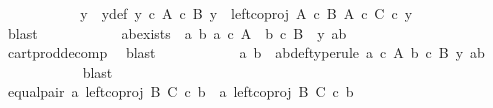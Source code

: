 \begin{isabellebody}
\ \ \ \ \ \ \ \ \isamarkupfalse%
\ \isamarkupfalse%
\ y{\isacharprime}{\kern0pt}\ \ y{\isacharprime}{\kern0pt}{\isacharunderscore}{\kern0pt}def{\isacharcolon}{\kern0pt}\ {\isachardoublequoteopen}y{\isacharprime}{\kern0pt}\ {\isasymin}\isactrlsub c\ A\ {\isasymtimes}\isactrlsub c\ B{\isachardoublequoteclose}\ {\isachardoublequoteopen}y\ {\isacharequal}{\kern0pt}\ left{\isacharunderscore}{\kern0pt}coproj\ {\isacharparenleft}{\kern0pt}A\ {\isasymtimes}\isactrlsub c\ B{\isacharparenright}{\kern0pt}\ {\isacharparenleft}{\kern0pt}A\ {\isasymtimes}\isactrlsub c\ C{\isacharparenright}{\kern0pt}\ {\isasymcirc}\isactrlsub c\ y{\isacharprime}{\kern0pt}{\isachardoublequoteclose}\isanewline
\ \ \ \ \ \ \ \ \ \ \isamarkupfalse%
\ blast\isanewline
\ \ \ \ \ \ \ \ \isamarkupfalse%
\ \isamarkupfalse%
\ ab{\isacharunderscore}{\kern0pt}exists{\isacharcolon}{\kern0pt}\ {\isachardoublequoteopen}{\isasymexists}\ a{\isacharprime}{\kern0pt}\ b{\isacharprime}{\kern0pt}{\isachardot}{\kern0pt}\ a{\isacharprime}{\kern0pt}\ {\isasymin}\isactrlsub c\ A\ {\isasymand}\ b{\isacharprime}{\kern0pt}\ {\isasymin}\isactrlsub c\ B\ {\isasymand}\ y{\isacharprime}{\kern0pt}\ {\isacharequal}{\kern0pt}{\isasymlangle}a{\isacharprime}{\kern0pt}{\isacharcomma}{\kern0pt}b{\isacharprime}{\kern0pt}{\isasymrangle}{\isachardoublequoteclose}\isanewline
\ \ \ \ \ \ \ \ \ \ \isamarkupfalse%
\ cart{\isacharunderscore}{\kern0pt}prod{\isacharunderscore}{\kern0pt}decomp\ \isamarkupfalse%
\ blast\isanewline
\ \ \ \ \ \ \ \ \isamarkupfalse%
\ \isamarkupfalse%
\ a{\isacharprime}{\kern0pt}\ b{\isacharprime}{\kern0pt}\ \ a{\isacharprime}{\kern0pt}b{\isacharprime}{\kern0pt}{\isacharunderscore}{\kern0pt}def{\isacharbrackleft}{\kern0pt}type{\isacharunderscore}{\kern0pt}rule{\isacharbrackright}{\kern0pt}{\isacharcolon}{\kern0pt}\ {\isachardoublequoteopen}a{\isacharprime}{\kern0pt}\ {\isasymin}\isactrlsub c\ A{\isachardoublequoteclose}\ {\isachardoublequoteopen}b{\isacharprime}{\kern0pt}\ {\isasymin}\isactrlsub c\ B{\isachardoublequoteclose}\ {\isachardoublequoteopen}y{\isacharprime}{\kern0pt}\ {\isacharequal}{\kern0pt}{\isasymlangle}a{\isacharprime}{\kern0pt}{\isacharcomma}{\kern0pt}b{\isacharprime}{\kern0pt}{\isasymrangle}{\isachardoublequoteclose}\isanewline
\ \ \ \ \ \ \ \ \ \ \isamarkupfalse%
\ blast\isanewline
\ \ \ \ \ \ \ \ \isamarkupfalse%
\ equal{\isacharunderscore}{\kern0pt}pair{\isacharcolon}{\kern0pt}\ {\isachardoublequoteopen}{\isasymlangle}a{\isacharcomma}{\kern0pt}\ left{\isacharunderscore}{\kern0pt}coproj\ B\ C\ {\isasymcirc}\isactrlsub c\ b{\isasymrangle}\ {\isacharequal}{\kern0pt}\ {\isasymlangle}a{\isacharprime}{\kern0pt}{\isacharcomma}{\kern0pt}\ left{\isacharunderscore}{\kern0pt}coproj\ B\ C\ {\isasymcirc}\isactrlsub c\ b{\isacharprime}{\kern0pt}{\isasymrangle}{\isachardoublequoteclose}\isanewline

\end{isabellebody}
